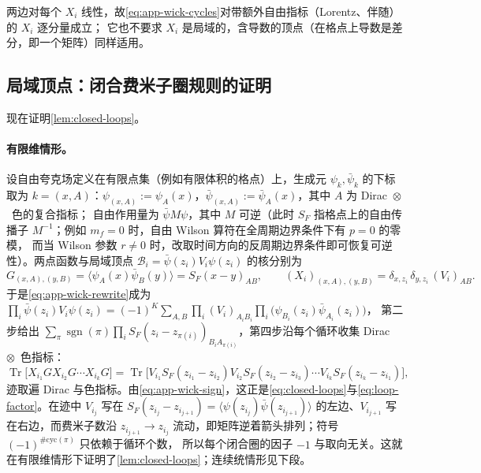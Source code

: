 \documentclass[UTF8,a4paper,11pt,fontset=fandol]{ctexart}
\theoremstyle{cplain}
\theoremstyle{cdefinition}
\theoremstyle{cremark}
\numberwithin{equation}{section}
\DeclareMathOperator{\Tr}{Tr}
\newcommand{\SF}{S_{F}}                              %
\begin{document}
两边对每个 $X_i$ 线性，故\cref{eq:app-wick-cycles}对带额外自由指标（Lorentz、伴随）的 $X_i$ 逐分量成立；
它也不要求 $X_i$ 是局域的，含导数的顶点（在格点上导数是差分，即一个矩阵）同样适用。

\subsection{局域顶点：闭合费米子圈规则的证明}\label{app:wick-proof}

现在证明\cref{lem:closed-loops}。

\paragraph{有限维情形。}
设自由夸克场定义在有限点集（例如有限体积的格点）上，生成元 $\psi_k,\bar\psi_k$ 的下标取为 $k=(x,A)$：$\psi_{(x,A)}:=\psi_A(x)$，$\bar\psi_{(x,A)}:=\bar\psi_A(x)$，其中 $A$ 为 Dirac~$\otimes$~色的复合指标；
自由作用量为 $\bar\psi M\psi$，其中 $M$ 可逆（此时 $\SF$ 指格点上的自由传播子 $M^{-1}$；例如 $m_f=0$ 时，自由 Wilson 算符在全周期边界条件下有 $p=0$ 的零模，
而当 Wilson 参数 $r\neq0$ 时，改取时间方向的反周期边界条件即可恢复可逆性）。两点函数与局域顶点 $\mathcal B_i=\bar\psi(z_i)V_i\psi(z_i)$ 的核分别为
\begin{equation*}
G_{(x,A),(y,B)}=\bigl\langle\psi_A(x)\bar\psi_B(y)\bigr\rangle=\SF(x-y)_{AB},\qquad
(X_i)_{(x,A),(y,B)}=\delta_{x,z_i}\,\delta_{y,z_i}\,(V_i)_{AB}.
\end{equation*}
于是\cref{eq:app-wick-rewrite}成为
$\prod_i\bar\psi(z_i)V_i\psi(z_i)=(-1)^K\sum_{A,B}\prod_i(V_i)_{A_iB_i}\prod_i\bigl(\psi_{B_i}(z_i)\bar\psi_{A_i}(z_i)\bigr)$，
第二步给出 $\sum_\pi\operatorname{sgn}(\pi)\prod_i\SF(z_i-z_{\pi(i)})_{B_iA_{\pi(i)}}$，第四步沿每个循环收集 Dirac~$\otimes$~色指标：
\begin{equation*}
\Tr\bigl[X_{i_1}GX_{i_2}G\cdots X_{i_k}G\bigr]=\Tr\bigl[V_{i_1}\SF(z_{i_1}-z_{i_2})V_{i_2}\SF(z_{i_2}-z_{i_3})\cdots V_{i_k}\SF(z_{i_k}-z_{i_1})\bigr],
\end{equation*}
迹取遍 Dirac 与色指标。由\cref{eq:app-wick-sign}，这正是\cref{eq:closed-loops}与\cref{eq:loop-factor}。在迹中 $V_{i_j}$ 写在 $\SF(z_{i_j}-z_{i_{j+1}})=\langle\psi(z_{i_j})\bar\psi(z_{i_{j+1}})\rangle$
的左边、$V_{i_{j+1}}$ 写在右边，而费米子数沿 $z_{i_{j+1}}\to z_{i_j}$ 流动，即矩阵逆着箭头排列；符号 $(-1)^{\#\mathrm{cyc}(\pi)}$ 只依赖于循环个数，
所以每个闭合圈的因子 $-1$ 与取向无关。这就在有限维情形下证明了\cref{lem:closed-loops}；连续统情形见下段。
\end{document}
